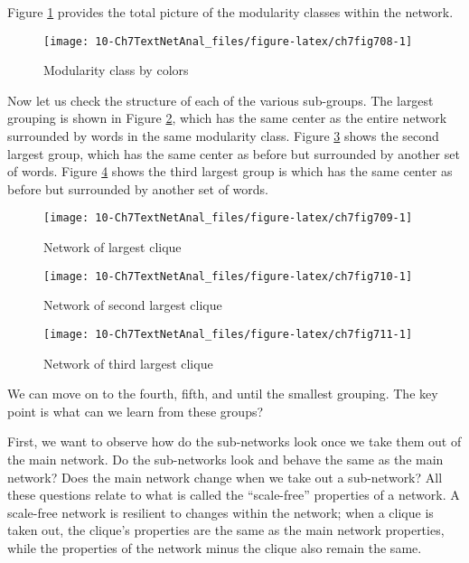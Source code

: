 \documentclass[
]{article}
\begin{document}
Figure \ref{fig:ch7fig708} provides the total picture of the modularity classes within the network.

\begin{figure}

{\centering \texttt{[image: 10-Ch7TextNetAnal\_files/figure-latex/ch7fig708-1]} 

}

\caption{Modularity class by colors}\label{fig:ch7fig708}
\end{figure}

Now let us check the structure of each of the various sub-groups. The largest grouping is shown in Figure \ref{fig:ch7fig709}, which has the same center as the entire network surrounded by words in the same modularity class. Figure \ref{fig:ch7fig710} shows the second largest group, which has the same center as before but surrounded by another set of words. Figure \ref{fig:ch7fig711} shows the third largest group is which has the same center as before but surrounded by another set of words.

\begin{figure}

{\centering \texttt{[image: 10-Ch7TextNetAnal\_files/figure-latex/ch7fig709-1]} 

}

\caption{Network of largest clique}\label{fig:ch7fig709}
\end{figure}

\begin{figure}

{\centering \texttt{[image: 10-Ch7TextNetAnal\_files/figure-latex/ch7fig710-1]} 

}

\caption{Network of second largest clique}\label{fig:ch7fig710}
\end{figure}

\begin{figure}

{\centering \texttt{[image: 10-Ch7TextNetAnal\_files/figure-latex/ch7fig711-1]} 

}

\caption{Network of third largest clique}\label{fig:ch7fig711}
\end{figure}

We can move on to the fourth, fifth, and until the smallest grouping. The key point is what can we learn from these groups?

First, we want to observe how do the sub-networks look once we take them out of the main network. Do the sub-networks look and behave the same as the main network? Does the main network change when we take out a sub-network? All these questions relate to what is called the ``scale-free'' properties of a network. A scale-free network is resilient to changes within the network; when a clique is taken out, the clique's properties are the same as the main network properties, while the properties of the network minus the clique also remain the same.
\end{document}
